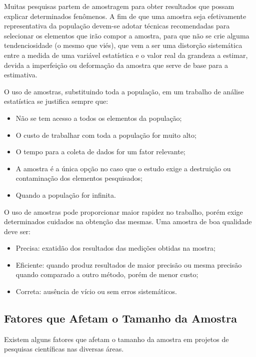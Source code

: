 \newpage 

Muitas pesquisas partem de amostragem para obter resultados que possam explicar determinados fenômenos. A fim de que uma amostra seja efetivamente representativa da população devem-se adotar técnicas recomendadas para selecionar os elementos que irão compor a amostra, para que não se crie alguma tendenciosidade (o mesmo que viés), que vem a ser uma distorção sistemática entre a medida de uma variável estatística e o valor real da grandeza a estimar, devida a imperfeição ou deformação da amostra que serve de base para a estimativa.\vskip0.3cm


O uso de amostras, substituindo toda a população, em um trabalho de análise estatística se justifica sempre que:
\begin{itemize}
\item Não se tem acesso a todos os elementos da população;
\item O custo de trabalhar com toda a população for muito alto;
\item O tempo para a coleta de dados for um fator relevante;
\item A amostra é a única opção no caso que o estudo exige a destruição ou contaminação dos elementos pesquisados;
\item Quando a população for infinita.
\end{itemize}


O uso de amostras pode proporcionar maior rapidez no trabalho, porém exige determinados cuidados na obtenção das mesmas. Uma amostra de boa qualidade deve ser:

\begin{itemize}
\item Precisa: exatidão dos resultados das medições obtidas na mostra;
\item Eficiente: quando produz resultados de maior precisão ou mesma precisão quando comparado a outro método, porém de menor custo;
\item Correta: ausência de vício ou sem erros sistemáticos.
\end{itemize}



\newpage
\subsection{Fatores que Afetam o Tamanho da Amostra} 
\inic Existem alguns fatores que afetam o tamanho da amostra em projetos de pesquisas científicas nas diversas áreas.


